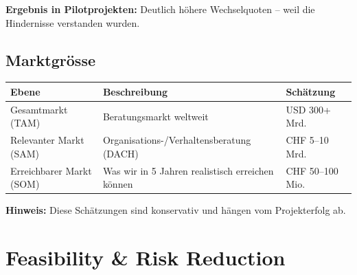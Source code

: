 \documentclass[11pt,a4paper]{article}
\begin{document}
\textbf{Ergebnis in Pilotprojekten:} Deutlich höhere Wechselquoten -- weil die Hindernisse verstanden wurden.

\subsection{Marktgrösse}

\begin{table}[h]
\centering
\begin{tabular}{@{}L{4cm}L{6cm}L{3cm}@{}}
\toprule
\textbf{Ebene} & \textbf{Beschreibung} & \textbf{Schätzung} \\
\midrule
Gesamtmarkt (TAM) & Beratungsmarkt weltweit & USD 300+ Mrd. \\
Relevanter Markt (SAM) & Organisations-/Verhaltensberatung (DACH) & CHF 5--10 Mrd. \\
Erreichbarer Markt (SOM) & Was wir in 5 Jahren realistisch erreichen können & CHF 50--100 Mio. \\
\bottomrule
\end{tabular}
\end{table}

\textbf{Hinweis:} Diese Schätzungen sind konservativ und hängen vom Projekterfolg ab.

\vspace{1cm}

\newpage


\section{Feasibility \& Risk Reduction}
\end{document}
